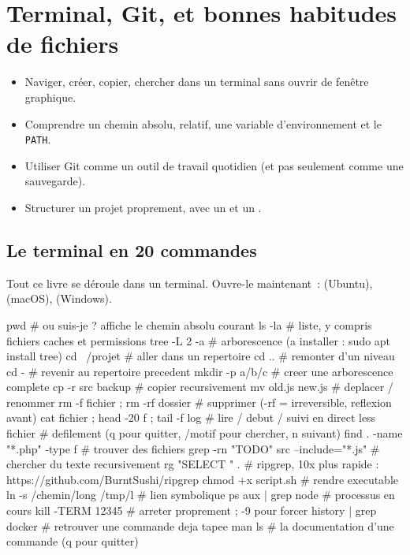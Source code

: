 \chapter{Terminal, Git, et bonnes habitudes de fichiers}
\label{ch-git}

\begin{objectif}
\begin{itemize}
  \item Naviger, cr\'eer, copier, chercher dans un terminal sans ouvrir de fen\^etre graphique.
  \item Comprendre un chemin absolu, relatif, une variable d'environnement et le \verb|PATH|.
  \item Utiliser Git comme un outil de travail quotidien (et pas seulement comme une sauvegarde).
  \item Structurer un projet proprement, avec un  et un .
\end{itemize}
\end{objectif}

\section{Le terminal en 20 commandes}

Tout ce livre se d\'eroule dans un terminal. Ouvre-le maintenant~:
 (Ubuntu),  (macOS),
 (Windows).

\begin{terminal}
pwd                       # ou suis-je ? affiche le chemin absolu courant
ls -la                    # liste, y compris fichiers caches et permissions
tree -L 2 -a          # arborescence (a installer : sudo apt install tree)
cd ~/projet           # aller dans un repertoire
cd ..                 # remonter d'un niveau
cd -                  # revenir au repertoire precedent
mkdir -p a/b/c        # creer une arborescence complete
cp -r src backup      # copier recursivement
mv old.js new.js      # deplacer / renommer
rm -f fichier ; rm -rf dossier    # supprimer (-rf = irreversible, reflexion avant)
cat fichier ; head -20 f ; tail -f log    # lire / debut / suivi en direct
less fichier          # defilement (q pour quitter, /motif pour chercher, n suivant)
find . -name "*.php" -type f       # trouver des fichiers
grep -rn "TODO" src --include="*.js"   # chercher du texte recursivement
rg "SELECT \*" .      # ripgrep, 10x plus rapide : https://github.com/BurntSushi/ripgrep
chmod +x script.sh    # rendre executable
ln -s /chemin/long /tmp/l  # lien symbolique
ps aux | grep node    # processus en cours
kill -TERM 12345      # arreter proprement ; -9 pour forcer
history | grep docker # retrouver une commande deja tapee
man ls                # la documentation d'une commande (q pour quitter)
\end{terminal}


